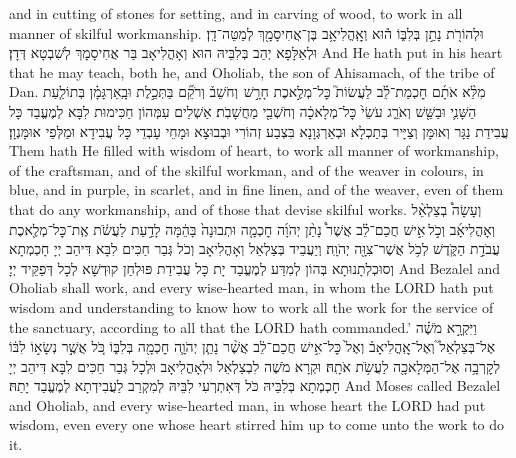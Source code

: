 {{and in cutting of stones for setting, and in carving of wood, to work in all manner of skilful workmanship.}{}
{וּלְהוֹרֹ֖ת נָתַ֣ן בְּלִבּ֑וֹ ה֕וּא וְאׇֽהֳלִיאָ֥ב בֶּן־אֲחִיסָמָ֖ךְ לְמַטֵּה־דָֽן׃
}
{וּלְאַלָּפָא יְהַב בְּלִבֵּיהּ הוּא וְאָהֳלִיאָב בַּר אֲחִיסָמָךְ לְשִׁבְטָא דְּדָן׃}
{And He hath put in his heart that he may teach, both he, and Oholiab, the son of Ahisamach, of the tribe of Dan.}{}
{מִלֵּ֨א אֹתָ֜ם חׇכְמַת־לֵ֗ב לַעֲשׂוֹת֮ כׇּל־מְלֶ֣אכֶת חָרָ֣שׁ \pasek  וְחֹשֵׁב֒ וְרֹקֵ֞ם בַּתְּכֵ֣לֶת וּבָֽאַרְגָּמָ֗ן בְּתוֹלַ֧עַת הַשָּׁנִ֛י וּבַשֵּׁ֖שׁ וְאֹרֵ֑ג עֹשֵׂי֙ כׇּל־מְלָאכָ֔ה וְחֹשְׁבֵ֖י מַחֲשָׁבֹֽת׃}
{אַשְׁלֵים עִמְּהוֹן חַכִּימוּת לִבָּא לְמֶעֱבַד כָּל עֲבִידַת נַגָּר וְאוּמָּן וְצַיָּיר בְּתַכְלָא וּבְאַרְגְּוָנָא בִּצְבַע זְהוֹרִי וּבְבוּצָא וּמָחֵי עָבְדֵי כָּל עֲבִידָא וּמַלְּפֵי אוּמָּנְוָן׃}
{Them hath He filled with wisdom of heart, to work all manner of workmanship, of the craftsman, and of the skilful workman, and of the weaver in colours, in blue, and in purple, in scarlet, and in fine linen, and of the weaver, even of them that do any workmanship, and of those that devise skilful works.}{}
\newperek
{}%
{וְעָשָׂה֩ בְצַלְאֵ֨ל וְאׇהֳלִיאָ֜ב וְכֹ֣ל \legarmeh  אִ֣ישׁ חֲכַם־לֵ֗ב אֲשֶׁר֩ נָתַ֨ן יְהֹוָ֜ה חׇכְמָ֤ה וּתְבוּנָה֙ בָּהֵ֔מָּה לָדַ֣עַת לַעֲשֹׂ֔ת אֶֽת־כׇּל־מְלֶ֖אכֶת עֲבֹדַ֣ת הַקֹּ֑דֶשׁ לְכֹ֥ל אֲשֶׁר־צִוָּ֖ה יְהֹוָֽה׃}
{וְיַעֲבֵיד בְּצַלְאֵל וְאָהֳלִיאָב וְכֹל גְּבַר חַכִּים לִבָּא דִּיהַב יְיָ חָכְמְתָא וְסוּכְלְתָנוּתָא בְּהוֹן לְמִדַּע לְמֶעֱבַד יָת כָּל עֲבִידַת פּוּלְחַן קוּדְשָׁא לְכָל דְּפַקֵּיד יְיָ׃}
{And Bezalel and Oholiab shall work, and every wise-hearted man, in whom the LORD hath put wisdom and understanding to know how to work all the work for the service of the sanctuary, according to all that the LORD hath commanded.’}{}
{וַיִּקְרָ֣א מֹשֶׁ֗ה אֶל־בְּצַלְאֵל֮ וְאֶל־אׇֽהֳלִיאָב֒ וְאֶל֙ כׇּל־אִ֣ישׁ חֲכַם־לֵ֔ב אֲשֶׁ֨ר נָתַ֧ן יְהֹוָ֛ה חׇכְמָ֖ה בְּלִבּ֑וֹ כֹּ֚ל אֲשֶׁ֣ר נְשָׂא֣וֹ לִבּ֔וֹ לְקׇרְבָ֥ה אֶל־הַמְּלָאכָ֖ה לַעֲשֹׂ֥ת אֹתָֽהּ׃}
{וּקְרָא מֹשֶׁה לִבְצַלְאֵל וּלְאָהֳלִיאָב וּלְכָל גְּבַר חַכִּים לִבָּא דִּיהַב יְיָ חָכְמְתָא בְּלִבֵּיהּ כֹּל דְּאִתְרְעִי לִבֵּיהּ לְמִקְרַב לַעֲבִידְתָא לְמֶעֱבַד יָתַהּ׃}
{And Moses called Bezalel and Oholiab, and every wise-hearted man, in whose heart the LORD had put wisdom, even every one whose heart stirred him up to come unto the work to do it.}{}
}
